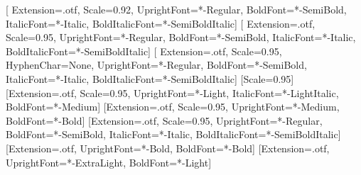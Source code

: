 \usepackage{fontspec}
\usepackage{unicode-math}
\setmainfont{IBMPlexSerif}[
  Extension=.otf, Scale=0.92,
  UprightFont=*-Regular, BoldFont=*-SemiBold,
  ItalicFont=*-Italic, BoldItalicFont=*-SemiBoldItalic]
\setsansfont{IBMPlexSans}[
  Extension=.otf, Scale=0.95,
  UprightFont=*-Regular, BoldFont=*-SemiBold,
  ItalicFont=*-Italic, BoldItalicFont=*-SemiBoldItalic]
\setmonofont{IBMPlexMono}[
  Extension=.otf, Scale=0.95, HyphenChar=None,
  UprightFont=*-Regular, BoldFont=*-SemiBold,
  ItalicFont=*-Italic, BoldItalicFont=*-SemiBoldItalic]
[Scale=0.95]
\newfontfamily{}[Extension=.otf, Scale=0.95,
  UprightFont=*-Light, ItalicFont=*-LightItalic, BoldFont=*-Medium]
\newfontfamily{}[Extension=.otf, Scale=0.95,
  UprightFont=*-Medium, BoldFont=*-Bold]
\newfontfamily{}[Extension=.otf, Scale=0.95,
  UprightFont=*-Regular, BoldFont=*-SemiBold,
  ItalicFont=*-Italic, BoldItalicFont=*-SemiBoldItalic]
\newfontfamily{}[Extension=.otf,
  UprightFont=*-Bold, BoldFont=*-Bold]
\newfontfamily{}[Extension=.otf,
  UprightFont=*-ExtraLight, BoldFont=*-Light]

